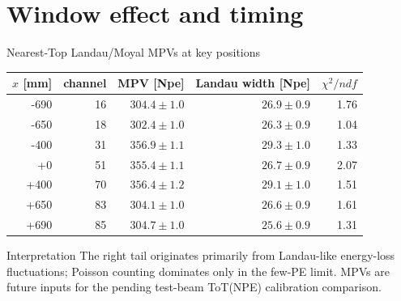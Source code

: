 \documentclass[aspectratio=169]{beamer}
\begin{document}
\section{Window effect and timing}
\begin{frame}{Nearest-Top Landau/Moyal MPVs at key positions}

\centering\small
\begin{tabular}{rrrrr}\toprule
$x$ [mm] & channel & MPV [Npe] & Landau width [Npe] & $\chi^2/ndf$ \\ \midrule
-690 & 16 & $304.4\pm1.0$ & $26.9\pm0.9$ & 1.76 \\
-650 & 18 & $302.4\pm1.0$ & $26.3\pm0.9$ & 1.04 \\
-400 & 31 & $356.9\pm1.1$ & $29.3\pm1.0$ & 1.33 \\
+0 & 51 & $355.4\pm1.1$ & $26.7\pm0.9$ & 2.07 \\
+400 & 70 & $356.4\pm1.2$ & $29.1\pm1.0$ & 1.51 \\
+650 & 83 & $304.1\pm1.0$ & $26.6\pm0.9$ & 1.61 \\
+690 & 85 & $304.7\pm1.0$ & $25.6\pm0.9$ & 1.31 \\
\bottomrule\end{tabular}
\begin{block}{Interpretation}
The right tail originates primarily from Landau-like energy-loss fluctuations; Poisson
counting dominates only in the few-PE limit. MPVs are future inputs for the pending
test-beam ToT(NPE) calibration comparison.
\end{block}

\end{frame}
\end{document}

